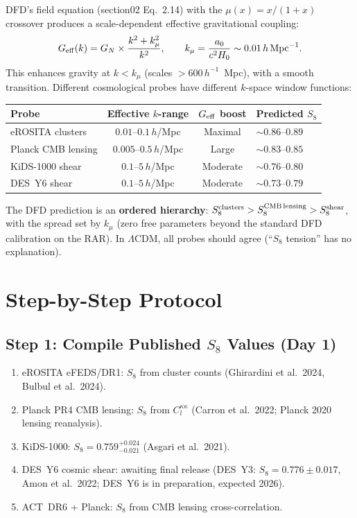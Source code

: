\documentclass[11pt]{article}
\newcommand{\LCDM}{\Lambda\text{CDM}}
\newcommand{\Geff}{G_{\rm eff}}
\begin{document}
DFD's field equation (section02 Eq.~2.14) with the $\mu(x) = x/(1+x)$
crossover produces a scale-dependent effective gravitational coupling:
\begin{equation}
\Geff(k) = G_N \times \frac{k^2 + k_\mu^2}{k^2},
\qquad k_\mu = \frac{a_0}{c^2 H_0} \sim 0.01\,h\,\text{Mpc}^{-1}.
\end{equation}
This enhances gravity at $k < k_\mu$ (scales $> 600\,h^{-1}$~Mpc),
with a smooth transition. Different cosmological probes have different
$k$-space window functions:

\begin{center}
\renewcommand{\arraystretch}{1.2}
\begin{tabular}{@{}lccl@{}}
\toprule
\textbf{Probe} & \textbf{Effective $k$-range} &
  \textbf{$\Geff$ boost} & \textbf{Predicted $S_8$} \\
\midrule
eROSITA clusters & $0.01$--$0.1\,h$/Mpc & Maximal &
  $\sim 0.86$--$0.89$ \\
Planck CMB lensing & $0.005$--$0.5\,h$/Mpc & Large &
  $\sim 0.83$--$0.85$ \\
KiDS-1000 shear & $0.1$--$5\,h$/Mpc & Moderate &
  $\sim 0.76$--$0.80$ \\
DES~Y6 shear & $0.1$--$5\,h$/Mpc & Moderate &
  $\sim 0.73$--$0.79$ \\
\bottomrule
\end{tabular}
\end{center}

The DFD prediction is an \textbf{ordered hierarchy}: $S_8^{\rm clusters}
> S_8^{\rm CMB\,lensing} > S_8^{\rm shear}$, with the spread set by
$k_\mu$ (zero free parameters beyond the standard DFD calibration on the
RAR). In $\LCDM$, all probes should agree (``$S_8$ tension'' has no
explanation).

\section{Step-by-Step Protocol}

\subsection{Step 1: Compile Published $S_8$ Values (Day 1)}

\begin{enumerate}[label=\textbf{1.\arabic*:}, nosep]
\item eROSITA eFEDS/DR1: $S_8$ from cluster counts
  (Ghirardini et al.\ 2024, Bulbul et al.\ 2024).
\item Planck PR4 CMB lensing: $S_8$ from $C_l^{\kappa\kappa}$
  (Carron et al.\ 2022; Planck 2020 lensing reanalysis).
\item KiDS-1000: $S_8 = 0.759^{+0.024}_{-0.021}$
  (Asgari et al.\ 2021).
\item DES~Y6 cosmic shear: awaiting final release (DES~Y3:
  $S_8 = 0.776 \pm 0.017$, Amon et al.\ 2022; DES~Y6 is in
  preparation, expected 2026).
\item ACT~DR6 + Planck: $S_8$ from CMB lensing cross-correlation.
\end{enumerate}
\end{document}
